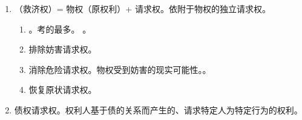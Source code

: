 \begin{enumerate}
        \begin{enumerate}
          \item {}（救济权）= 物权（原权利）+ 请求权。依附于物权的独立请求权。
                \begin{enumerate}
                  \item {}。考的最多。
                        。
                  \item 排除妨害请求权。
                  \item 消除危险请求权。物权受到妨害的现实可能性。。
                  \item 恢复原状请求权。
                \end{enumerate}
          \item 债权请求权。权利人基于债的关系而产生的、请求特定人为特定行为的权利。
        \end{enumerate}
\end{enumerate}
